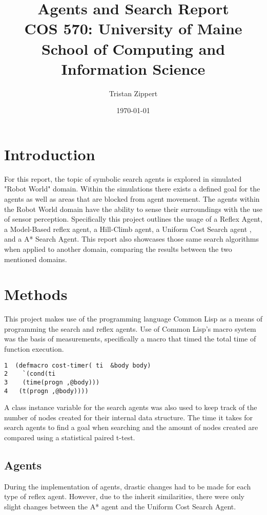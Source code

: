 \documentclass[11pt]{article}
\author{Tristan Zippert}
\date{\today}
\title{Agents and Search Report\\\medskip
\large COS 570:  University of Maine School of Computing and Information Science}
\begin{document}
\maketitle
\tableofcontents
\clearpage
\section{Introduction}
\label{sec:orga9fa7be}
For this report, the topic of symbolic search agents is explored in
simulated "Robot World" domain.  Within the simulations 
there exists a defined goal for the agents as well as areas that are
blocked from agent movement. The agents within the Robot World domain have the ability to sense their
surroundings with the use of sensor perception.
Specifically this project outlines the usage of a Reflex Agent,
a Model-Based reflex agent, a Hill-Climb  agent, a Uniform Cost Search agent
, and a A* Search Agent. 
This report also showcases those same search algorithms
when applied to another domain,
comparing the results between the two mentioned domains. 
\section{Methods}
\label{sec:org324f7bd}
This project makes use of the programming language Common Lisp as a means of programming the search and reflex agents.
Use of Common Lisp's macro system was the basis of measurements, specifically a macro  that timed the
total time of function execution.
\begin{verbatim}
1  (defmacro cost-timer( ti  &body body)
2    `(cond(ti
3  	 (time(progn ,@body))) 
4   (t(progn ,@body))))
\end{verbatim}
A class instance variable for the search agents was also used to keep track of the number of nodes created for their
internal data structure. The time it takes for search agents to find a goal when searching and the amount of
nodes created are compared using a statistical paired t-test.


\subsection{Agents}
\label{sec:org48546dc}
During the implementation of agents, drastic changes had to be made for each type of reflex agent. 
However, due to the inherit similarities, there were only slight changes between the A* agent
and the Uniform Cost Search Agent. 
\end{document}
